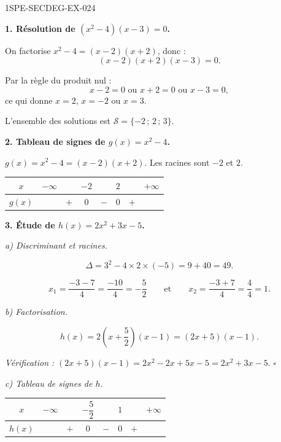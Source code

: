\begin{corrige}{1SPE-SECDEG-EX-024}

\textbf{1. Résolution de $(x^2 - 4)(x - 3) = 0$.}


On factorise $x^2 - 4 = (x-2)(x+2)$, donc :
\[(x-2)(x+2)(x-3) = 0.\]

Par la règle du produit nul :
\[x - 2 = 0 \text{ ou } x + 2 = 0 \text{ ou } x - 3 = 0,\]
ce qui donne $x = 2$, $x = -2$ ou $x = 3$.

L'ensemble des solutions est $\mathcal{S} = \{-2\,;\,2\,;\,3\}$.

\medskip
\textbf{2. Tableau de signes de $g(x) = x^2 - 4$.}


$g(x) = x^2 - 4 = (x-2)(x+2)$. Les racines sont $-2$ et $2$.

\medskip
\begin{center}
\begin{tabular}{|c|ccccccc|}
\hline
$x$ & $-\infty$ & & $-2$ & & $2$ & & $+\infty$ \\
\hline
$g(x)$ & & $+$ & $0$ & $-$ & $0$ & $+$ & \\
\hline
\end{tabular}
\end{center}

\medskip
\textbf{3. Étude de $h(x) = 2x^2 + 3x - 5$.}


\textit{a) Discriminant et racines.}

\[\Delta = 3^2 - 4 \times 2 \times (-5) = 9 + 40 = 49.\]

\[x_1 = \frac{-3 - 7}{4} = \frac{-10}{4} = -\frac{5}{2} \qquad \text{et} \qquad x_2 = \frac{-3 + 7}{4} = \frac{4}{4} = 1.\]

\textit{b) Factorisation.}

\[h(x) = 2\!\left(x + \frac{5}{2}\right)\!(x - 1) = (2x + 5)(x - 1).\]

\textit{Vérification :} $(2x+5)(x-1) = 2x^2 - 2x + 5x - 5 = 2x^2 + 3x - 5$. \hfill $\square$

\textit{c) Tableau de signes de $h$.}


\medskip
\begin{center}
\begin{tabular}{|c|ccccccc|}
\hline
$x$ & $-\infty$ & & $-\dfrac{5}{2}$ & & $1$ & & $+\infty$ \\
\hline
$h(x)$ & & $+$ & $0$ & $-$ & $0$ & $+$ & \\
\hline
\end{tabular}
\end{center}


\end{corrige}
